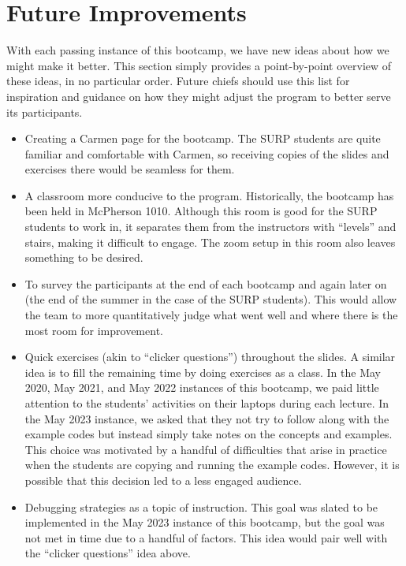 
\section{Future Improvements}
\label{sec:improvements}
\noindent
With each passing instance of this bootcamp, we have new ideas about how we
might make it better.
This section simply provides a point-by-point overview of these ideas, in
no particular order.
Future chiefs should use this list for inspiration and guidance on how they
might adjust the program to better serve its participants.
\begin{itemize}

	\item Creating a Carmen page for the bootcamp.
	The SURP students are quite familiar and comfortable with Carmen, so
	receiving copies of the slides and exercises there would be seamless for
	them.

	\item A classroom more conducive to the program.
	Historically, the bootcamp has been held in McPherson 1010.
	Although this room is good for the SURP students to work in, it separates
	them from the instructors with ``levels'' and stairs, making it difficult
	to engage.
	The zoom setup in this room also leaves something to be desired.

	\item To survey the participants at the end of each bootcamp and again
	later on (the end of the summer in the case of the SURP students).
	This would allow the team to more quantitatively judge what went well and
	where there is the most room for improvement.

	\item Quick exercises (akin to ``clicker questions'') throughout the
	slides.
	A similar idea is to fill the remaining time by doing exercises as a class.
	In the May 2020, May 2021, and May 2022 instances of this bootcamp, we paid
	little attention to the students' activities on their laptops during each
	lecture.
	In the May 2023 instance, we asked that they not try to follow along with
	the example codes but instead simply take notes on the concepts and
	examples.
	This choice was motivated by a handful of difficulties that arise in
	practice when the students are copying and running the example codes.
	However, it is possible that this decision led to a less engaged audience.

	\item Debugging strategies as a topic of instruction.
	This goal was slated to be implemented in the May 2023 instance of this
	bootcamp, but the goal was not met in time due to a handful of factors.
	This idea would pair well with the ``clicker questions'' idea above.


\end{itemize}
